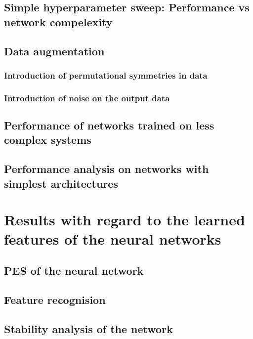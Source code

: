 \documentclass[]{report}
\begin{document}
\subsection{Simple hyperparameter sweep: Performance vs network compelexity}

\subsection{Data augmentation}
\subsubsection{Introduction of permutational symmetries in data}
\subsubsection{Introduction of noise on the output data}

\subsection{Performance of networks trained on less complex systems}

\subsection{Performance analysis on networks with simplest architectures}

\section{Results with regard to the learned features of the neural networks}

\subsection{PES of the neural network}

\subsection{Feature recognision}

\subsection{Stability analysis of the network}
\end{document}
